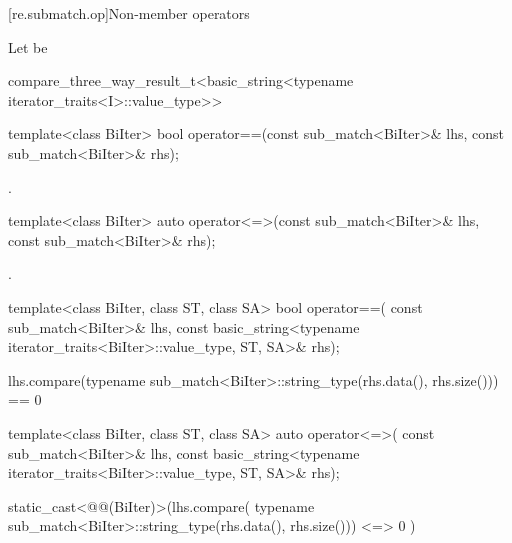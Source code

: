 [re.submatch.op]{Non-member operators}

\pnum
Let  be
\begin{codeblock}
compare_three_way_result_t<basic_string<typename iterator_traits<I>::value_type>>
\end{codeblock}

%
\begin{itemdecl}
template<class BiIter>
  bool operator==(const sub_match<BiIter>& lhs, const sub_match<BiIter>& rhs);
\end{itemdecl}

\begin{itemdescr}
\pnum
\returns
{}.
\end{itemdescr}

%
\begin{itemdecl}
template<class BiIter>
  auto operator<=>(const sub_match<BiIter>& lhs, const sub_match<BiIter>& rhs);
\end{itemdecl}

\begin{itemdescr}
\pnum
\returns
{}.
\end{itemdescr}

%
\begin{itemdecl}
template<class BiIter, class ST, class SA>
  bool operator==(
      const sub_match<BiIter>& lhs,
      const basic_string<typename iterator_traits<BiIter>::value_type, ST, SA>& rhs);
\end{itemdecl}

\begin{itemdescr}
\pnum
\returns
\begin{codeblock}
lhs.compare(typename sub_match<BiIter>::string_type(rhs.data(), rhs.size())) == 0
\end{codeblock}
\end{itemdescr}

%
\begin{itemdecl}
template<class BiIter, class ST, class SA>
  auto operator<=>(
      const sub_match<BiIter>& lhs,
      const basic_string<typename iterator_traits<BiIter>::value_type, ST, SA>& rhs);
\end{itemdecl}

\begin{itemdescr}
\pnum
\returns
\begin{codeblock}
static_cast<@@(BiIter)>(lhs.compare(
    typename sub_match<BiIter>::string_type(rhs.data(), rhs.size()))
      <=> 0
    )
\end{codeblock}
\end{itemdescr}

